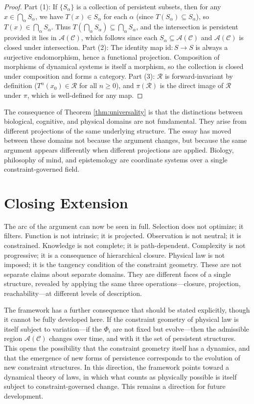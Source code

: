 \documentclass[12pt, a4paper, oneside]{article}
\theoremstyle{plain}
\theoremstyle{definition}
\theoremstyle{remark}
\newcommand{\C}{\mathcal{C}}
\newcommand{\R}{\mathcal{R}}
\newcommand{\A}{\mathcal{A}}
\newcommand{\T}{T}
\newcommand{\proj}{\pi}
\begin{document}
\begin{proof}
Part (1): If $\{S_\alpha\}$ is a collection of persistent subsets, then for any $x \in \bigcap_\alpha S_\alpha$, we have $\T(x) \in S_\alpha$ for each $\alpha$ (since $\T(S_\alpha) \subseteq S_\alpha$), so $\T(x) \in \bigcap_\alpha S_\alpha$. Thus $\T(\bigcap_\alpha S_\alpha) \subseteq \bigcap_\alpha S_\alpha$, and the intersection is persistent provided it lies in $\A(\C)$, which follows since each $S_\alpha \subseteq \A(\C)$ and $\A(\C)$ is closed under intersection. Part (2): The identity map $\mathrm{id} : S \to S$ is always a surjective endomorphism, hence a functional projection. Composition of morphisms of dynamical systems is itself a morphism, so the collection is closed under composition and forms a category. Part (3): $\R$ is forward-invariant by definition ($\T^n(x_0) \in \R$ for all $n \geq 0$), and $\proj(\R)$ is the direct image of $\R$ under $\proj$, which is well-defined for any map.
\end{proof}

The consequence of Theorem \ref{thm:universality} is that the distinctions between biological, cognitive, and physical domains are not fundamental. They arise from different projections of the same underlying structure. The essay has moved between these domains not because the argument changes, but because the same argument appears differently when different projections are applied. Biology, philosophy of mind, and epistemology are coordinate systems over a single constraint-governed field.

\section{Closing Extension}

The arc of the argument can now be seen in full. Selection does not optimize; it filters. Function is not intrinsic; it is projected. Observation is not neutral; it is constrained. Knowledge is not complete; it is path-dependent. Complexity is not progressive; it is a consequence of hierarchical closure. Physical law is not imposed; it is the tangency condition of the constraint geometry. These are not separate claims about separate domains. They are different faces of a single structure, revealed by applying the same three operations---closure, projection, reachability---at different levels of description.

The framework has a further consequence that should be stated explicitly, though it cannot be fully developed here. If the constraint geometry of physical law is itself subject to variation---if the $\Phi_i$ are not fixed but evolve---then the admissible region $\A(\C)$ changes over time, and with it the set of persistent structures. This opens the possibility that the constraint geometry itself has a dynamics, and that the emergence of new forms of persistence corresponds to the evolution of new constraint structures. In this direction, the framework points toward a dynamical theory of laws, in which what counts as physically possible is itself subject to constraint-governed change. This remains a direction for future development.
\end{document}
